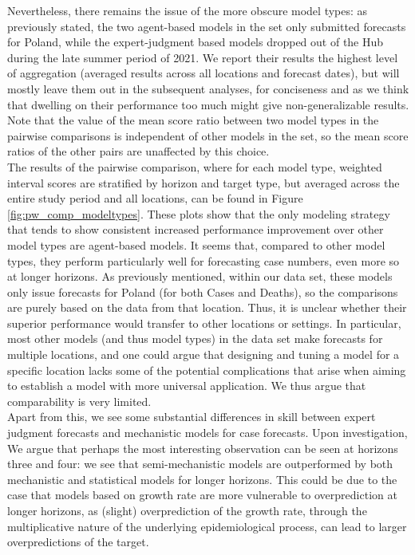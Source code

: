 Nevertheless, there remains the issue of the more obscure model types: as previously stated, the two agent-based models in the set only submitted forecasts for Poland, while the expert-judgment based models dropped out of the Hub during the late summer period of 2021. We report their results the highest level of aggregation (averaged results across all locations and forecast dates), but will mostly leave them out in the subsequent analyses, for conciseness and as we think that dwelling on their performance too much might give non-generalizable results. Note that the value of the mean score ratio between two model types in the pairwise comparisons is independent of other models in the set, so the mean score ratios of the other pairs are unaffected by this choice.\\
The results of the pairwise comparison, where for each model type, weighted interval scores are stratified by horizon and target type, but averaged across the entire study period and all locations, can be found in Figure \ref{fig:pw_comp_modeltypes}. These plots show that the only modeling strategy that tends to show consistent increased performance improvement over other model types are agent-based models. It seems that, compared to other model types, they perform particularly well for forecasting case numbers, even more so at longer horizons. As previously mentioned, within our data set, these models only issue forecasts for Poland (for both Cases and Deaths), so the comparisons are purely based on the data from that location. Thus, it is unclear whether their superior performance would transfer to other locations or settings. In particular, most other models (and thus model types) in the data set make forecasts for multiple locations, and one could argue that designing and tuning a model for a specific location lacks some of the potential complications that arise when aiming to establish a model with more universal application. We thus argue that comparability is very limited.\\
Apart from this, we see some substantial differences in skill between expert judgment forecasts and mechanistic models for case forecasts. Upon investigation,  \\
We argue that perhaps the most interesting observation can be seen at horizons three and four: we see that semi-mechanistic models are outperformed by both mechanistic and statistical models for longer horizons. This could be due to the case that models based on growth rate are more vulnerable to overprediction at longer horizons, as (slight) overprediction of the growth rate, through the multiplicative nature of the underlying epidemiological process, can lead to larger overpredictions of the target. \\
